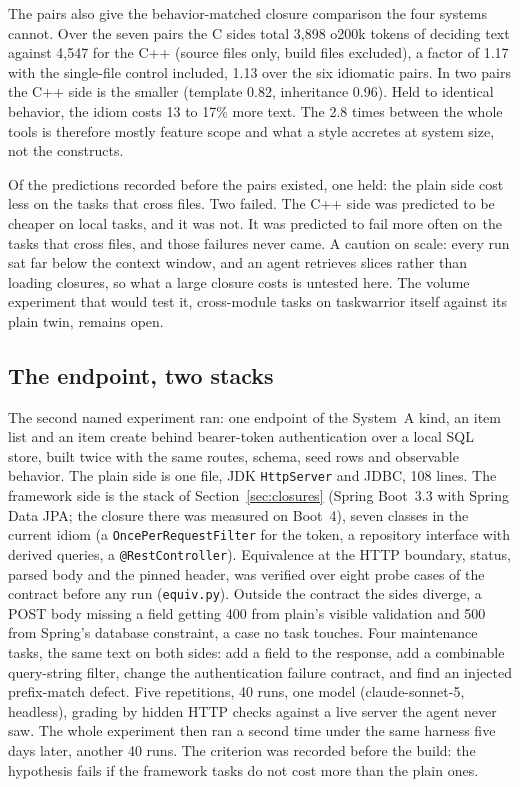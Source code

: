 \documentclass[journal]{IEEEtran}
\begin{document}
The pairs also give the behavior-matched closure comparison the four
systems cannot. Over the seven pairs the C sides total 3,898 o200k tokens
of deciding text against 4,547 for the C++ (source files only, build
files excluded), a factor of 1.17 with the single-file control included, 1.13 over the
six idiomatic pairs. In two pairs the C++ side is the smaller
(template 0.82, inheritance 0.96). Held to identical behavior, the idiom
costs 13 to 17\% more text. The 2.8 times
between the whole tools is therefore mostly feature scope and what a
style accretes at system size, not the constructs.

Of the predictions recorded before the pairs existed, one held: the
plain side cost less on the tasks that cross files. Two failed. The C++
side was predicted to be cheaper on local tasks, and it was not. It was
predicted to fail more often on the tasks that cross files, and those
failures never came. A caution on scale: every run sat far below the context window,
and an agent retrieves slices rather than loading closures, so what a
large closure costs is untested here. The volume experiment that would
test it, cross-module tasks on taskwarrior itself against its plain
twin, remains open.

\subsection{The endpoint, two stacks}
\label{sec:endpoint}

The second named experiment ran: one endpoint of the System~A kind, an
item list and an item create behind bearer-token authentication over a
local SQL store, built twice with the same routes, schema, seed rows and
observable behavior. The plain side is one file, JDK
\texttt{HttpServer} and JDBC, 108 lines. The framework side is the
stack of Section~\ref{sec:closures} (Spring Boot~3.3 with Spring Data JPA; the closure
there was measured on Boot~4), seven
classes in the current idiom (a \texttt{OncePerRequestFilter} for the
token, a repository interface with derived queries, a
\texttt{@RestController}). Equivalence at the HTTP boundary, status,
parsed body and the pinned header, was verified over eight probe cases
of the contract before any run (\texttt{equiv.py}). Outside the
contract the sides diverge, a POST body missing a field getting 400
from plain's visible validation and 500 from Spring's database
constraint, a case no task touches. Four maintenance tasks,
the same text on both sides: add a field to the response, add a
combinable query-string filter, change the authentication failure
contract, and find an injected prefix-match defect. Five repetitions,
40 runs, one model (claude-sonnet-5, headless), grading by hidden HTTP
checks against a live server the agent never saw. The whole experiment
then ran a second time under the same harness five days later, another
40 runs. The criterion was recorded before the build: the hypothesis
fails if the framework tasks do not cost more than the plain ones.
\end{document}
